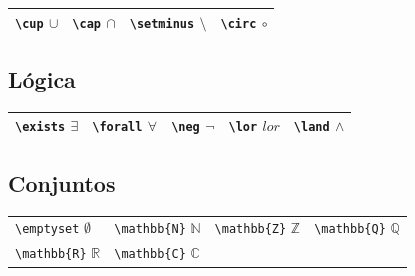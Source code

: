\documentclass[
  letterpaper,
  DIV=11,
  numbers=noendperiod]{scrreport}
\begin{document}
\begin{longtable}[]{@{}
  >{\raggedright\arraybackslash}p{}
  >{\raggedright\arraybackslash}p{}
  >{\raggedright\arraybackslash}p{}
  >{\raggedright\arraybackslash}p{}@{}}
\toprule()
\endhead
\texttt{\textbackslash{}cup} \(\cup\) & \texttt{\textbackslash{}cap}
\(\cap\) & \texttt{\textbackslash{}setminus} \(\setminus\) &
\texttt{\textbackslash{}circ} \(\circ\) \\
\bottomrule()
\end{longtable}

\hypertarget{luxf3gica}{%
\subsection{Lógica}\label{luxf3gica}}

\begin{longtable}[]{@{}
  >{\raggedright\arraybackslash}p{}
  >{\raggedright\arraybackslash}p{}
  >{\raggedright\arraybackslash}p{}
  >{\raggedright\arraybackslash}p{}
  >{\raggedright\arraybackslash}p{}@{}}
\toprule()
\endhead
\texttt{\textbackslash{}exists} \(\exists\) &
\texttt{\textbackslash{}forall} \(\forall\) &
\texttt{\textbackslash{}neg} \(\neg\) & \texttt{\textbackslash{}lor}
\(lor\) & \texttt{\textbackslash{}land} \(\land\) \\
\bottomrule()
\end{longtable}

\hypertarget{conjuntos}{%
\subsection{Conjuntos}\label{conjuntos}}

\begin{longtable}[]{@{}
  >{\raggedright\arraybackslash}p{}
  >{\raggedright\arraybackslash}p{}
  >{\raggedright\arraybackslash}p{}
  >{\raggedright\arraybackslash}p{}@{}}
\toprule()
\endhead
\texttt{\textbackslash{}emptyset} \(\emptyset\) &
\texttt{\textbackslash{}mathbb\{N\}} \(\mathbb{N}\) &
\texttt{\textbackslash{}mathbb\{Z\}} \(\mathbb{Z}\) &
\texttt{\textbackslash{}mathbb\{Q\}} \(\mathbb{Q}\) \\
\texttt{\textbackslash{}mathbb\{R\}} \(\mathbb{R}\) &
\texttt{\textbackslash{}mathbb\{C\}} \(\mathbb{C}\) & & \\
\bottomrule()
\end{longtable}
\end{document}
